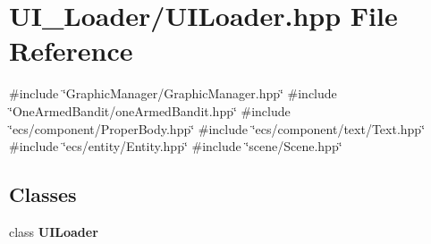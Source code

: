 \section{U\+I\+\_\+\+Loader/\+U\+I\+Loader.hpp File Reference}
\label{_u_i_loader_8hpp}
{\ttfamily \#include \char`\"{}Graphic\+Manager/\+Graphic\+Manager.\+hpp\char`\"{}}\newline
{\ttfamily \#include \char`\"{}One\+Armed\+Bandit/one\+Armed\+Bandit.\+hpp\char`\"{}}\newline
{\ttfamily \#include \char`\"{}ecs/component/\+Proper\+Body.\+hpp\char`\"{}}\newline
{\ttfamily \#include \char`\"{}ecs/component/text/\+Text.\+hpp\char`\"{}}\newline
{\ttfamily \#include \char`\"{}ecs/entity/\+Entity.\+hpp\char`\"{}}\newline
{\ttfamily \#include \char`\"{}scene/\+Scene.\+hpp\char`\"{}}\newline
\subsection*{Classes}
\begin{DoxyCompactItemize}
\item 
class \textbf{ U\+I\+Loader}
\end{DoxyCompactItemize}
